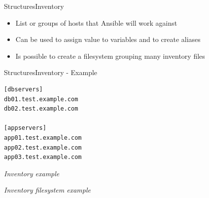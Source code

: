 \documentclass[10pt]{beamer}
\begin{document}
\begin{frame}[fragile]{Structures}{Inventory}
\begin{itemize}
    \item List or groups of hosts that Ansible will work against
    \item Can be used to assign value to variables and to create aliases 
    \item Is possible to create a filesystem grouping many inventory files
\end{itemize}
\end{frame}



\begin{frame}[fragile]{Structures}{Inventory - Example}
\begin{minipage}[t]{0.45\linewidth}


\begin{verbatim}
[dbservers]
db01.test.example.com
db02.test.example.com

[appservers]
app01.test.example.com
app02.test.example.com
app03.test.example.com
  \end{verbatim}
\footnotesize \textit{Inventory example}
\end{minipage}
%
\begin{minipage}[t]{0.45\linewidth}

  \footnotesize \textit{Inventory filesystem example}
\end{minipage}

\end{frame}
\end{document}
